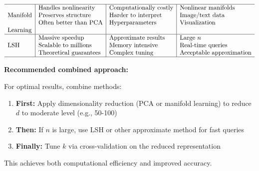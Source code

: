 \documentclass[12pt]{article}
\begin{document}
\begin{solution}
\[\begin{array}{l|l|l|l}
\hline
\text{Manifold} & \begin{tabular}{@{}l@{}} Handles nonlinearity \\ Preserves structure \\ Often better than PCA \end{tabular} & \begin{tabular}{@{}l@{}} Computationally costly \\ Harder to interpret \\ Hyperparameters \end{tabular} & \begin{tabular}{@{}l@{}} Nonlinear manifolds \\ Image/text data \\ Visualization \end{tabular} \\
\text{Learning} & & & \\
\hline
\text{LSH} & \begin{tabular}{@{}l@{}} Massive speedup \\ Scalable to millions \\ Theoretical guarantees \end{tabular} & \begin{tabular}{@{}l@{}} Approximate results \\ Memory intensive \\ Complex tuning \end{tabular} & \begin{tabular}{@{}l@{}} Large \(n\) \\ Real-time queries \\ Acceptable approximation \end{tabular} \\
\hline
\end{array}
\]

\textbf{Recommended combined approach:}

For optimal results, combine methods:
\begin{enumerate}
    \item \textbf{First:} Apply dimensionality reduction (PCA or manifold learning) to reduce \(d\) to moderate level (e.g., 50-100)
    \item \textbf{Then:} If \(n\) is large, use LSH or other approximate method for fast queries
    \item \textbf{Finally:} Tune \(k\) via cross-validation on the reduced representation
\end{enumerate}

This achieves both computational efficiency and improved accuracy.
\end{solution}
\end{document}
